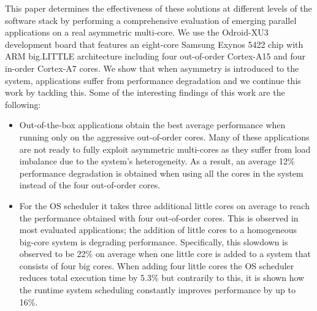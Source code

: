 This paper determines the effectiveness of these solutions at different levels of the software stack by performing a comprehensive evaluation of emerging parallel applications on a real asymmetric multi-core. We use the Odroid-XU3 development board that features an eight-core Samsung Exynos 5422 chip with ARM big.LITTLE architecture including four out-of-order Cortex-A15 and four in-order Cortex-A7 cores. We show that when asymmetry is introduced to the system, applications suffer from performance degradation and we continue this work by tackling this. Some of the interesting findings of this work are the following:
\begin{itemize}
 \item Out-of-the-box applications obtain the best average performance when running only on the aggressive out-of-order cores. Many of these applications are not ready to fully exploit asymmetric multi-cores as they suffer from load imbalance due to the system's heterogeneity. As a result, an average 12\% performance degradation is obtained when using all the cores in the system instead of the four out-of-order cores. 
 \item For the OS scheduler it takes three additional little cores on average to reach the performance obtained with four out-of-order cores. This is observed in most evaluated applications; the addition of little cores to a homogeneous big-core system is degrading performance. Specifically, this slowdown is observed to be 22\% on average when one little core is added to a system that consists of four big cores.
When adding four little cores the OS scheduler reduces total execution time by 5.3\% but contrarily to this, it is shown how the runtime system scheduling constantly improves performance by up to 16\%.
  

\end{itemize}
